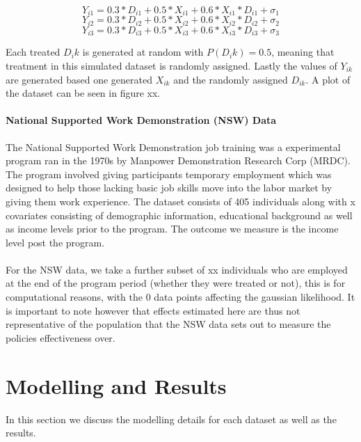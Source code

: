\documentclass{article}
\begin{document}
\begin{equation}
\label{eqn:latent_reg1}
Y_{i1} = 0.3 * D_{i1} + 0.5*X_{i1} + 0.6*X_{i1}*D_{i1} + \sigma_1
\end{equation}
\begin{equation}
\label{eqn:latent_reg1}
Y_{i2} = 0.3 * D_{i2} + 0.5*X_{i2} + 0.6*X_{i2}*D_{i2} + \sigma_2
\end{equation}
\begin{equation}
\label{eqn:latent_reg1}
Y_{i3} = 0.3 * D_{i3} + 0.5*X_{i3} + 0.6*X_{i3}*D_{i3} + \sigma_3
\end{equation}

Each treated $D_ik$ is generated at random with $P(D_ik) = 0.5$, meaning that treatment in this simulated dataset is randomly assigned. Lastly the values of $Y_{ik}$ are generated based one generated $X_{ik}$ and the randomly assigned $D_{ik}$. A plot of the dataset can be seen in figure xx. 

\paragraph{National Supported Work Demonstration (NSW) Data} The National Supported Work Demonstration job training was a experimental program ran in the 1970s by Manpower Demonstration Research Corp (MRDC). The program involved giving participants temporary employment which was designed to help those lacking basic job skills move into the labor market by giving them work experience. The dataset consists of 405 individuals along with x covariates consisting of demographic information, educational background as well as income levels prior to the program. The outcome we measure is the income level post the program. 
\\ \\ 
For the NSW data, we take a further subset of xx individuals who are employed at the end of the program period (whether they were treated or not), this is for computational reasons, with the 0 data points affecting the gaussian likelihood. It is important to note however that effects estimated here are thus not representative of the population that the NSW data sets out to measure the policies effectiveness over.


\section{Modelling and Results}
In this section we discuss the modelling details for each dataset as well as the results. 
\end{document}
